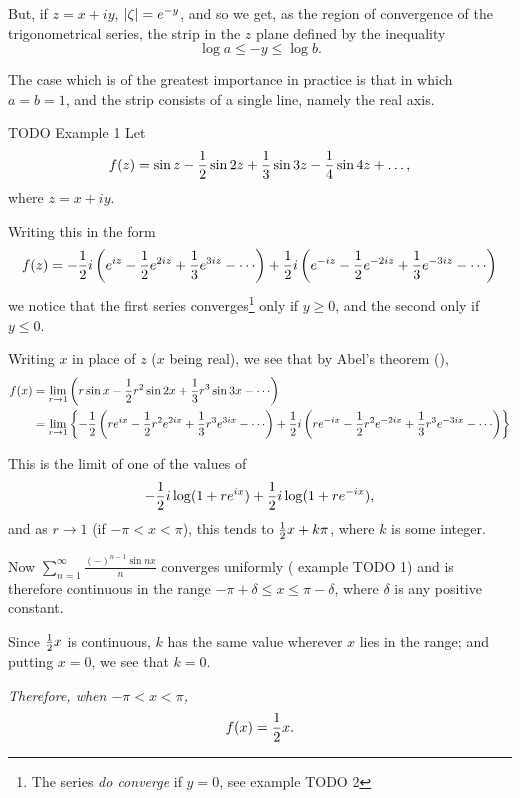 But, if $z = x + iy$, $\left| \zeta \right| = e^{-y}$, and so we get, as the
region of convergence of the trigonometrical series, the strip in the
$z$ plane defined by the inequality
$$
\log a \leq -y \leq \log b.
$$

The case which is of the greatest importance in practice is that in which
$a = b = 1$, and the strip consists of a single line, namely the real axis.

TODO Example 1
Let
$$
f(z)
=
\sin z
- \frac{1}{2} \sin 2z
+ \frac{1}{3} \sin 3z
- \frac{1}{4} \sin 4z
+ \ldots,
$$
where $z = x + iy$.
%
%

Writing this in the form
$$
f(z)
=
-
\half
i
\theparen{
  e^{iz}
  - \half e^{2iz}
  + \frac{1}{3} e^{3iz}
  -
  \cdots
}
+
\half
i
\theparen{
  e^{-iz}
  - \half e^{-2iz}
  + \frac{1}{3} e^{-3iz}
  -
  \cdots
}
$$
we notice that the first series converges\footnote{The series
  \emph{do converge} if $y=0$, see  example TODO 2}
only if
$y \geq 0$, and the second only if $y \leq 0$.

Writing $x$ in place of $z$ ($x$ being real), we see that by Abel's
theorem (),
\begin{align*}
  f(x)
  &=
  \lim_{r \rightarrow 1} \theparen{
    r \sin x
    - \half r^{2} \sin 2x
    + \frac{1}{3} r^{3} \sin 3x
    - \cdots
  }
  \\
  &=
  \lim_{r \rightarrow 1} \thebrace{
    - \half \theparen{
      r e^{ix}
      - \half r^{2} e^{2ix}
      + \frac{1}{3} r^{3} e^{3ix}
      - \cdots
    }
    +
    \half i \theparen{
      r e^{-ix}
      - \half r^{2} e^{-2ix}
      + \frac{1}{3} r^{3} e^{-3ix}
      - \cdots
    }
  }
\end{align*}

This is the limit of one of the values of
$$
- \frac{1}{2} i \log (1 + r e^{ix})
+ \frac{1}{2} i \log (1 + r e^{-ix}),
$$
and as $r \rightarrow 1$ (if $-\pi < x < \pi$), this tends to
$\frac{1}{2} x + k\pi$, where $k$ is some integer.

Now $\sum_{n=1}^{\infty} \frac{(-)^{n-1} \sin nx}{n}$ converges uniformly
( example TODO 1) and is therefore continuous in
the range $-\pi + \delta \leq x \leq \pi - \delta$, where
$\delta$ is any positive constant.

Since $\frac{1}{2} x$ is continuous, $k$ has the same value wherever $x$ lies in the
range; and putting $x=0$, we see that $k=0$.

\emph{Therefore, when $-\pi < x < \pi$,
  $$
  f(x) = \frac{1}{2} x.
  $$
}

